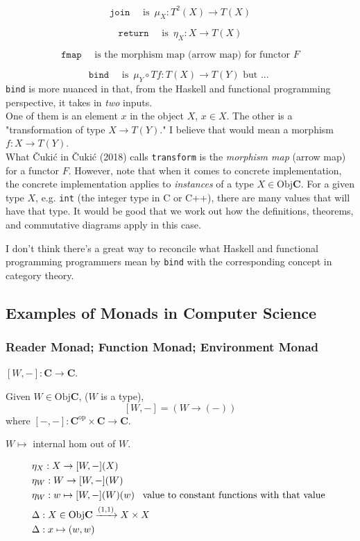 \[
\boxed{ \texttt{join} \quad \text{ is } \, \mu_X : T^2(X) \to T(X)}
\]

\[
\boxed{ \texttt{return} \quad \text{ is } \, \eta_X: X \to T(X) }
\]

\[
\boxed{ \texttt{fmap} \quad \text{ is the morphism map (arrow map) for functor } F}
\]

\[
\boxed{ \texttt{bind} \quad \text{ is } \, \mu_Y \circ Tf : T(X) \to T(Y) \text{ but ... }}
\]
\texttt{bind} is more nuanced in that, from the Haskell and functional programming perspective, it takes in \emph{two} inputs. \\

One of them is an element $x$ in the object $X$, $x \in X$. The other is a "transformation of type $X \to T(Y)$." I believe that would mean a morphism $f: X \to T(Y)$.  \\

What \v{C}uki\'{c} in \v{C}uki\'{c} (2018) \cite{agat:Cuki2018} calls \texttt{transform} is the \emph{morphism map} (arrow map) for a functor $F$. However, note that when it comes to concrete implementation, the concrete implementation applies to \emph{instances} of a type $X \in \text{Obj}{\mathbf{C}}$. For a given type $X$, e.g. \verb|int| (the integer type in C or C++), there are many values that will have that type. It would be good that we work out how the definitions, theorems, and commutative diagrams apply in this case.



I don't think there's a great way to reconcile what Haskell and functional programming programmers mean by \texttt{bind} with the corresponding concept in category theory. 

\subsection{Examples of Monads in Computer Science}


\subsubsection{Reader Monad; Function Monad; Environment Monad} $[W, -] : \mathbf{C}\to \mathbf{C}$.

Given $W \in \text{Obj}{\mathbf{C}}$, ($W$ is a type), 
\[
[W, - ] = (W \to (-))
\]
where $[-, -] : \mathbf{C}^{\text{op}} \times \mathbf{C} \to \mathbf{C}$.

$W \mapsto $ internal hom out of $W$.

\[
\begin{aligned} 
& \eta_X : X \to [W, -](X) \\ 
& \eta_W: W \to [W, -](W) \\ 
& \eta_W : w \mapsto [W,-](W)(w) \text{ \, value to constant functions with that value } \\ 
& \Delta : X \in \text{Obj}{\mathbf{C}} \xrightarrow{ (1,1) } X \times X \\ 
& \Delta : x \mapsto (w,w)
\end{aligned} 
\]

